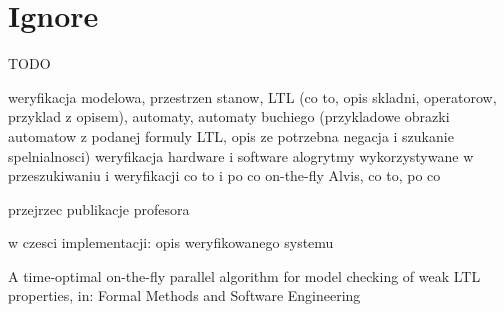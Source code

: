 \section{Ignore}

TODO

weryfikacja modelowa, przestrzen stanow, LTL (co to, opis skladni, operatorow, przyklad z opisem), automaty, automaty buchiego (przykladowe obrazki automatow z podanej formuly LTL, opis ze potrzebna negacja i szukanie spelnialnosci)
weryfikacja hardware i software
alogrytmy wykorzystywane w przeszukiwaniu i weryfikacji
co to i po co on-the-fly
Alvis, co to, po co

\cite{Bar12} \cite{Jac05}
przejrzec publikacje profesora


w czesci implementacji:
opis weryfikowanego systemu


A time-optimal on-the-fly parallel algorithm for model checking of weak LTL properties, in: Formal Methods and Software Engineering

 
